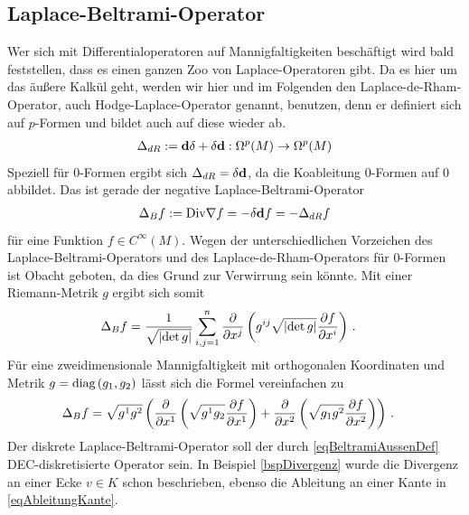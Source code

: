   \subsection{Laplace-Beltrami-Operator}
    Wer sich mit Differentialoperatoren auf Mannigfaltigkeiten beschäftigt wird bald feststellen, dass es
    einen ganzen Zoo von Laplace-Operatoren gibt.
    Da es hier um das äußere Kalkül geht, werden wir hier und im Folgenden den Laplace-de-Rham-Operator,
    auch Hodge-Laplace-Operator genannt, benutzen, denn er definiert sich auf \( p \)-Formen und bildet
    auch auf diese wieder ab.
    \begin{align}
      \Delta_{dR} := \mathbf{d}\delta + \delta\mathbf{d}: \Omega^{p}(M) \rightarrow \Omega^{p}(M)
    \end{align}
    Speziell für \( 0 \)-Formen ergibt sich \( \Delta_{dR} = \delta\mathbf{d} \), da die Koableitung \( 0
    \)-Formen auf \( 0 \) abbildet.
    Das ist gerade der negative Laplace-Beltrami-Operator
    \begin{align}
      \label{eqBeltramiAussenDef}
      \Delta_{B}f := \text{Div}\nabla f = -\delta\mathbf{d} f = -\Delta_{dR} f
    \end{align}
    für eine Funktion \( f\in C^{\infty}(M) \).
    Wegen der unterschiedlichen Vorzeichen des Laplace-Beltrami-Operators und des Laplace-de-Rham-Operators
    für \( 0 \)-Formen ist Obacht geboten, da dies Grund zur Verwirrung sein könnte.
    Mit einer Riemann-Metrik \( g \) ergibt sich somit
    \begin{align}
      \Delta_{B} f &= \frac{1}{\sqrt{\left| \det g \right|}} \sum_{i,j=1}^{n} \frac{\partial}{\partial x^{j}} \left( g^{ij}\sqrt{\left| \det g \right|} \frac{\partial f}{\partial x^{i}}
      \right) \,\text{.}
    \end{align}
    Für eine zweidimensionale Mannigfaltigkeit mit orthogonalen Koordinaten und Metrik \( g=\text{diag}\left( g_{1},g_{2} \right) \) lässt sich die Formel vereinfachen zu
    \begin{align}
    \label{eqLaplaceBeltramiOrthogonal}
      \Delta_{B} f &=\sqrt{g^{1}g^{2}} \left(  \frac{\partial}{\partial x^{1}} \left( \sqrt{g^{1}g_{2}} \frac{\partial f}{\partial x^{1}} \right) 
                                             + \frac{\partial}{\partial x^{2}} \left( \sqrt{g_{1}g^{2}} \frac{\partial f}{\partial x^{2}} \right) \right) \,\text{.}
    \end{align}
    Der diskrete Laplace-Beltrami-Operator soll der durch \eqref{eqBeltramiAussenDef} DEC-diskretisierte Operator sein.
    In Beispiel \ref{bspDivergenz} wurde die Divergenz an einer Ecke \( v\in K \) schon beschrieben, ebenso die Ableitung an einer Kante in \eqref{eqAbleitungKante}.
